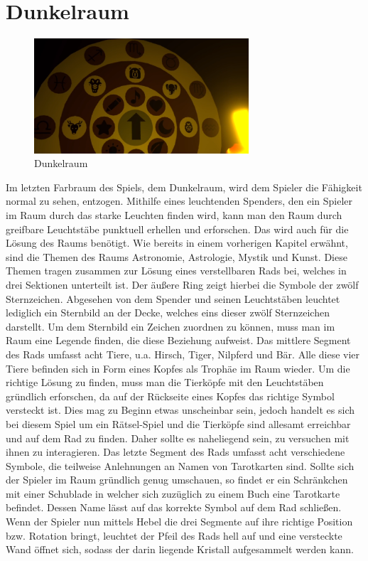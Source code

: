 \section{Dunkelraum}
\begin{figure}
	\vspace*{-0.5cm}
	\includegraphics[width=8cm]{Pictures/Dunkelraum}
	\caption{Dunkelraum}
	\vspace*{-0.5cm}
	\label{fig:dunkelraum}
\end{figure}
Im letzten Farbraum des Spiels, dem Dunkelraum, wird dem Spieler die Fähigkeit normal zu sehen, entzogen. Mithilfe eines leuchtenden Spenders, den ein Spieler im Raum durch das starke Leuchten finden wird, kann man den Raum durch greifbare Leuchtstäbe punktuell erhellen und erforschen. Das wird auch für die Lösung des Raums benötigt. Wie bereits in einem vorherigen Kapitel erwähnt, sind die Themen des Raums Astronomie, Astrologie, Mystik und Kunst. Diese Themen tragen zusammen zur Lösung eines verstellbaren Rads bei, welches in drei Sektionen unterteilt ist. Der äußere Ring zeigt hierbei die Symbole der zwölf Sternzeichen. Abgesehen von dem Spender und seinen Leuchtstäben leuchtet lediglich ein Sternbild an der Decke, welches eins dieser zwölf Sternzeichen darstellt. Um dem Sternbild ein Zeichen zuordnen zu können, muss man im Raum eine Legende finden, die diese Beziehung aufweist. Das mittlere Segment des Rads umfasst acht Tiere, u.a. Hirsch, Tiger, Nilpferd und Bär. Alle diese vier Tiere befinden sich in Form eines Kopfes als Trophäe im Raum wieder. Um die richtige Lösung zu finden, muss man die Tierköpfe mit den Leuchtstäben gründlich erforschen, da auf der Rückseite eines Kopfes das richtige Symbol versteckt ist. Dies mag zu Beginn etwas unscheinbar sein, jedoch handelt es sich bei diesem Spiel um ein Rätsel-Spiel und die Tierköpfe sind allesamt erreichbar und auf dem Rad zu finden. Daher sollte es naheliegend sein, zu versuchen mit ihnen zu interagieren. Das letzte Segment des Rads umfasst acht verschiedene Symbole, die teilweise Anlehnungen an Namen von Tarotkarten sind. Sollte sich der Spieler im Raum gründlich genug umschauen, so findet er ein Schränkchen mit einer Schublade in welcher sich zuzüglich zu einem Buch eine Tarotkarte befindet. Dessen Name lässt auf das korrekte Symbol auf dem Rad schließen. Wenn der Spieler nun mittels Hebel die drei Segmente auf ihre richtige Position bzw. Rotation bringt, leuchtet der Pfeil des Rads hell auf und eine versteckte Wand öffnet sich, sodass der darin liegende Kristall aufgesammelt werden kann.
